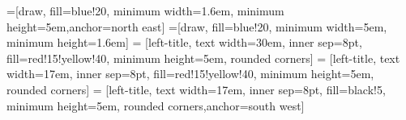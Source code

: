 \documentclass[a4paper]{article}
\def\parchmentframe#1{
\tikz{
  \node[inner sep=2em] (A) {#1};  %
  \begin{pgfonlayer}{background}  %
  \filldraw[normal border,rounded corners=2em,color=blue!10!yellow!5,draw=blue!25!yellow,dashed]
        (A.south east) -- (A.south west) --
        (A.north west) -- (A.north east) -- cycle;
  \end{pgfonlayer}}}
\def\parchmentframetop#1{
\tikz{
  \node[inner sep=2em] (A) {#1};    %
  \begin{pgfonlayer}{background}
  \filldraw[normal border,rounded corners,color=blue!10!yellow!5,draw=blue!25!yellow,dashed]
        (A.south east) -- (A.south west) --
        (A.north west) -- (A.north east) -- cycle;
  \end{pgfonlayer}}}
\def\parchmentframebottom#1{
\tikz{
  \node[inner sep=2em] (A) {#1};   %
  \begin{pgfonlayer}{background}
  \filldraw[normal border,rounded corners,color=blue!10!yellow!5,draw=blue!25!yellow,dashed]
        (A.south east) -- (A.south west) --
        (A.north west) -- (A.north east) -- cycle;
  \end{pgfonlayer}}}
\def\parchmentframemiddle#1{
\tikz{
  \node[inner sep=2em] (A) {#1};   %
  \begin{pgfonlayer}{background}
  \filldraw[normal border,rounded corners,color=blue!10!yellow!5,draw=blue!25!yellow,dashed]
        (A.south east) -- (A.south west) --
        (A.north west) -- (A.north east) -- cycle;
  \end{pgfonlayer}}}
\newenvironment{parchment}[1][Example]{%
  \def\FrameCommand{\parchmentframe}%
  \def\FirstFrameCommand{\parchmentframetop}%
  \def\LastFrameCommand{\parchmentframebottom}%
  \def\MidFrameCommand{\parchmentframemiddle}%
  \vskip\baselineskip
  \MakeFramed {\FrameRestore}
  \noindent\tikz\node[rounded corners=2ex, inner sep=2ex, draw=blue!25!yellow, fill=white, dashed, anchor=west, overlay] at (0em, 2em) {\sffamily#1};\par}%
{\endMakeFramed}
\begin{document}
\fontsize{9.5}{11}\selectfont
{}


=[draw, fill=blue!20, minimum width=1.6em, minimum height=5em,anchor=north east]
=[draw, fill=blue!20, minimum width=5em, minimum height=1.6em]
 = [left-title, text width=30em, inner sep=8pt, fill=red!15!yellow!40, minimum height=5em, rounded corners]
 = [left-title, text width=17em, inner sep=8pt, fill=red!15!yellow!40, minimum height=5em, rounded corners]
 = [left-title, text width=17em, inner sep=8pt, fill=black!5, minimum height=5em, rounded corners,anchor=south west]

\begin{comment}
\begin{parchment}[commentarii de bello gallico]
  Gallia est omnis divisa in partes tres, quarum unam incolunt Belgae, aliam Aquitani, tertiam qui ipsorum lingua Celtae, nostra Galli appellantur. Hi omnes lingua, institutis, legibus inter se differunt. Gallos ab Aquitanis Garumna flumen, a Belgis Matrona et Sequana dividit. Horum omnium fortissimi sunt Belgae, propterea quod a cultu atque humanitate provinciae longissime absunt, minimeque ad eos mercatores saepe commeant atque ea quae ad effeminandos animos pertinent important, proximique sunt Germanis, qui trans Rhenum incolunt, quibuscum continenter bellum gerunt. Qua de causa Helvetii quoque reliquos Gallos virtute praecedunt, quod fere cotidianis proeliis cum Germanis contendunt, cum aut suis finibus eos prohibent aut ipsi in eorum finibus bellum gerunt. Eorum una pars, quam Gallos obtinere dictum est, initium capit a flumine Rhodano, continetur Garumna flumine, Oceano, finibus Belgarum, attingit etiam ab Sequanis et Helvetiis flumen Rhenum, vergit ad septentriones. Belgae ab extremis Galliae finibus oriuntur, pertinent ad inferiorem partem fluminis Rheni, spectant in septentrionem et orientem solem. Aquitania a Garumna flumine ad Pyrenaeos montes et eam partem Oceani quae est ad Hispaniam pertinet; spectat inter occasum solis et septentriones.
\end{parchment}
\end{comment}
\end{document}
